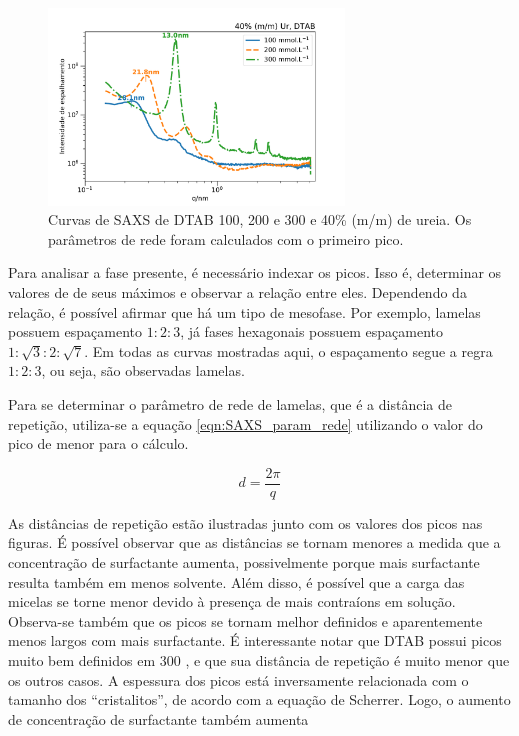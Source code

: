 	\begin{figure}[H]
		\centering
		\includegraphics[width=0.7\textwidth]{imagens/saxs/DTAB_conc}
		\caption{Curvas de SAXS de DTAB 100, 200 e 300 \mM{} e 40\% (m/m) de ureia. Os parâmetros de rede foram calculados com o primeiro pico.}
		\label{fig:SAXS_dtabconc}
	\end{figure}
	
		Para analisar a fase presente, é necessário indexar os picos. Isso é, determinar os valores de \q{} de seus máximos e observar a relação entre eles. Dependendo da relação, é possível afirmar que há um tipo de mesofase. Por exemplo, lamelas possuem espaçamento $1:2:3$, já fases hexagonais possuem espaçamento $1:\sqrt{3}:2:\sqrt{7}$. Em todas as curvas mostradas aqui, o espaçamento segue a regra $1:2:3$, ou seja, são observadas lamelas.
	
	Para se determinar o parâmetro de rede de lamelas, que é a distância de repetição, utiliza-se a equação \ref{eqn:SAXS_param_rede} utilizando o valor do pico de menor \q{} para o cálculo.
	
	
	\begin{equation}
	d = \frac{2\pi}{q}
	\label{eqn:SAXS_param_rede}
	\end{equation}
	
	As distâncias de repetição estão ilustradas junto com os valores dos picos nas figuras. É possível observar que as distâncias se tornam menores a medida que a concentração de surfactante aumenta, possivelmente porque mais surfactante resulta também em menos solvente. Além disso, é possível que a carga das micelas se torne menor devido à presença de mais contraíons em solução. Observa-se também que os picos se tornam melhor definidos e aparentemente menos largos com mais surfactante. É interessante notar que DTAB possui picos muito bem definidos em 300 \mM, e que sua distância de repetição é muito menor que os outros casos. A espessura dos picos está inversamente relacionada com o tamanho dos ``cristalitos'', de acordo com a equação de Scherrer. Logo, o aumento de concentração de surfactante também aumenta 

